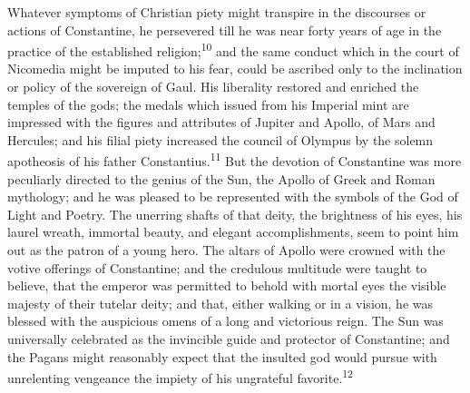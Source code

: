 
Whatever symptoms of Christian piety might transpire in the discourses
or actions of Constantine, he persevered till he was near forty years
of age in the practice of the established religion;\textsuperscript{10} and the same
conduct which in the court of Nicomedia might be imputed to his fear,
could be ascribed only to the inclination or policy of the sovereign of
Gaul. His liberality restored and enriched the temples of the gods; the
medals which issued from his Imperial mint are impressed with the
figures and attributes of Jupiter and Apollo, of Mars and Hercules; and
his filial piety increased the council of Olympus by the solemn
apotheosis of his father Constantius.\textsuperscript{11} But the devotion of
Constantine was more peculiarly directed to the genius of the Sun, the
Apollo of Greek and Roman mythology; and he was pleased to be
represented with the symbols of the God of Light and Poetry. The
unerring shafts of that deity, the brightness of his eyes, his laurel
wreath, immortal beauty, and elegant accomplishments, seem to point him
out as the patron of a young hero. The altars of Apollo were crowned
with the votive offerings of Constantine; and the credulous multitude
were taught to believe, that the emperor was permitted to behold with
mortal eyes the visible majesty of their tutelar deity; and that,
either walking or in a vision, he was blessed with the auspicious omens
of a long and victorious reign. The Sun was universally celebrated as
the invincible guide and protector of Constantine; and the Pagans might
reasonably expect that the insulted god would pursue with unrelenting
vengeance the impiety of his ungrateful favorite.\textsuperscript{12}



